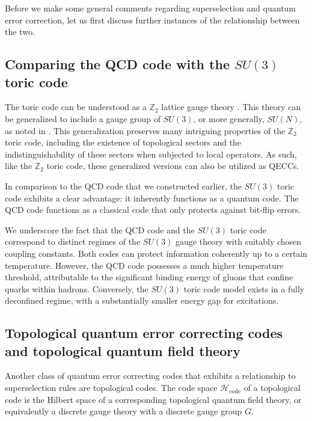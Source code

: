 \documentclass[11pt,english]{article}
\begin{document}
Before we make some general comments regarding superselection and quantum error correction, let us first discuss further instances of the relationship between the two.

\subsection{Comparing the QCD code with the $SU(3)$ toric code}


The toric code can be understood as a $\mathbb{Z}_2$ lattice gauge theory \cite{PhysRevD.19.3682}. This theory can be generalized to include a gauge group of $SU(3)$, or more generally, $SU(N)$, as noted in \cite{PhysRevA.105.052423, PhysRevB.79.045316}. This generalization preserves many intriguing properties of the $\mathbb{Z}_2$ toric code, including the existence of topological sectors and the indistinguishability of these sectors when subjected to local operators. As such, like the $\mathbb{Z}_2$ toric code, these generalized versions can also be utilized as QECCs.

In comparison to the QCD code that we constructed earlier, the $SU(3)$ toric code exhibits a clear advantage: it inherently functions as a quantum code. The QCD code functions as a classical code that only protects against bit-flip errors. 

We underscore the fact that the QCD code and the $SU(3)$ toric code correspond to distinct regimes of the $SU(3)$ gauge theory with suitably chosen coupling constants. Both codes can protect information coherently up to a certain temperature. However, the QCD code possesses a much higher temperature threshold, attributable to the significant binding energy of gluons that confine quarks within hadrons. Conversely, the $SU(3)$ toric code model exists in a fully deconfined regime, with a substantially smaller energy gap for excitations.

\subsection{Topological quantum error correcting codes and topological quantum field theory}
Another class of quantum error correcting codes that exhibits a relationship to superselection rules are topological codes.   The code space $\mathcal{H}_\text{code}$ of a topological code is the Hilbert space of a corresponding topological quantum field theory, or equivalently a discrete gauge theory with a discrete gauge group $G$.
\end{document}
